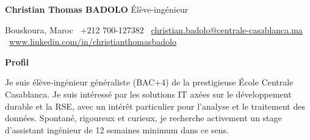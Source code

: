 \documentclass[11pt]{article}
\newcommand{\sectiontitle}[1]{\noindent\textbf{\large #1}}
\newcommand{\name}[1]{\textcolor{blue!80!black}{\textbf{\large #1}}}
\newcommand{\email}[1]{\href{mailto:{#1}}{#1}}
\newcommand{\website}[1]{\href{#1}{#1}}
\begin{document}
\begin{center}
    \name{\textbf{Christian Thomas BADOLO}}
    \hrulefill
    \textsf{\small Élève-ingénieur} \\
\end{center}

\begin{center}
    Bouskoura, Maroc \textbullet \ +212 700-127382 \textbullet \ \email{christian.badolo@centrale-casablanca.ma} \textbullet \ \website{www.linkedin.com/in/christianthomasbadolo}
\end{center}

\vspace{0.5pt}

\sectiontitle{Profil}

Je suis élève-ingénieur généraliste (BAC+4) de la prestigieuse École Centrale Casablanca. Je suis intéressé par les solutions IT axées sur le développement durable et la RSE, avec un intérêt particulier pour l'analyse et le traitement des données. Spontané, rigoureux et curieux, je recherche activement un stage d'assistant ingénieur de 12 semaines minimum dans ce sens.
\end{document}
